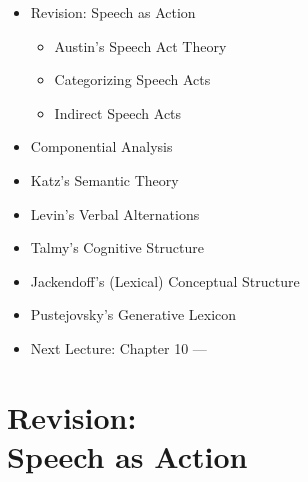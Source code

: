 \documentclass[headrule,footrule]{foils}
\begin{document}
\maketitle

%

\begin{itemize}\addtolength{\itemsep}{-1ex}
\item Revision: Speech as Action
  \begin{itemize}
  \item Austin's Speech Act Theory
  \item Categorizing Speech Acts
  \item Indirect Speech Acts
  \end{itemize}
\item Componential Analysis
\item Katz's Semantic Theory
\item Levin's Verbal Alternations
\item Talmy's Cognitive Structure
\item Jackendoff's (Lexical) Conceptual Structure
\item Pustejovsky's Generative Lexicon
\item Next Lecture: Chapter 10 --- 
\end{itemize}




\MyLogo{}



\section{Revision: \\ Speech as Action}


\end{document}
